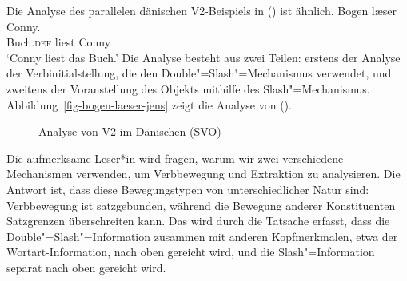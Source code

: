 Die Analyse des parallelen dänischen V2-Beispiels in () ist ähnlich.
\ea
\gll Bogen             læser Conny.\\
     Buch.\textsc{def} liest Conny\\
\glt `Conny liest das Buch.'
\z
Die Analyse besteht aus zwei Teilen: erstens der Analyse der Verbinitialstellung, die den
Double"=Slash"=Mechanismus verwendet, und zweitens der Voranstellung des Objekts mithilfe des Slash"=Mechanismus.
Abbildung~\vref{fig-bogen-laeser-jens} zeigt die Analyse von ().
\begin{figure}
\scalebox{.95}{%
\begin{forest}
sm edges
[S
   [NP$_i$ [bogen;Buch.\textsc{def}] ]
      [S/NP
         [V \sliste{ S//V }
           [V [læser$_j$;liest] ] ]
           [S//\vSLASHnp
             [NP [Conny;Conny] ]
             [VP//\vSLASHnp
               [V//V  [\_$_j$] ]
               [NP/NP [\trace$_i$ ] ] ] ] ] ] ]
\end{forest}}
\caption{\label{fig-bogen-laeser-jens}Analyse von V2 im Dänischen (SVO)}
\end{figure}

Die aufmerksame Leser*in wird fragen, warum wir zwei verschiedene Mechanismen verwenden, um Verbbewegung und
Extraktion zu analysieren. Die Antwort ist, dass diese Bewegungstypen von unterschiedlicher Natur sind: Verbbewegung ist
satzgebunden, während die Bewegung anderer Konstituenten Satzgrenzen überschreiten kann. Das wird durch die
Tatsache erfasst, dass die Double"=Slash"=Information zusammen mit anderen Kopfmerkmalen, etwa der
Wortart-Information, nach oben gereicht wird, und die Slash"=Information separat nach oben gereicht wird.


